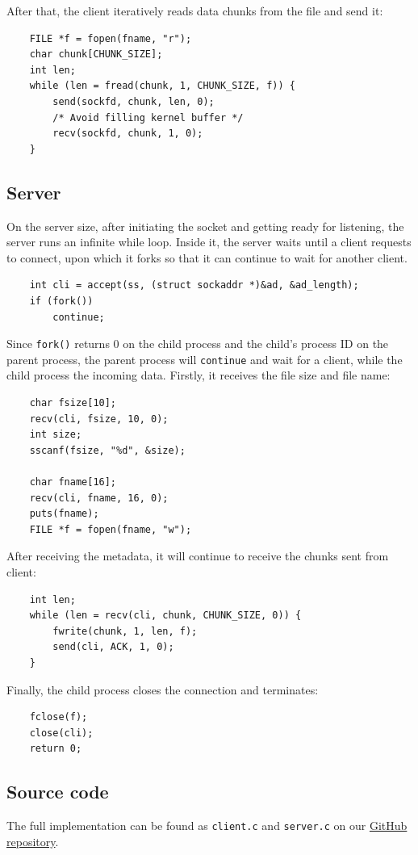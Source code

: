 \documentclass{article}
\begin{document}
After that, the client iteratively reads data chunks from the file and send it:

\begin{verbatim}
	FILE *f = fopen(fname, "r");
	char chunk[CHUNK_SIZE];
	int len;
	while (len = fread(chunk, 1, CHUNK_SIZE, f)) {
		send(sockfd, chunk, len, 0);
		/* Avoid filling kernel buffer */
		recv(sockfd, chunk, 1, 0);
	}
\end{verbatim}

\subsection{Server}

On the server size, after initiating the socket and getting ready for listening,
the server runs an infinite while loop. Inside it, the server waits until a client
requests to connect, upon which it forks so that it can continue
to wait for another client.

\begin{verbatim}
	int cli = accept(ss, (struct sockaddr *)&ad, &ad_length);
	if (fork())
		continue;
\end{verbatim}

Since \texttt{fork()} returns 0 on the child process and the child's process ID
on the parent process, the parent process will \texttt{continue} and wait for a client,
while the child process the incoming data. Firstly, it receives the file size and file name:

\begin{verbatim}
	char fsize[10];
	recv(cli, fsize, 10, 0);
	int size;
	sscanf(fsize, "%d", &size);

	char fname[16];
	recv(cli, fname, 16, 0);
	puts(fname);
	FILE *f = fopen(fname, "w");
\end{verbatim}

After receiving the metadata, it will continue to receive the chunks sent from client:

\begin{verbatim}
	int len;
	while (len = recv(cli, chunk, CHUNK_SIZE, 0)) {
		fwrite(chunk, 1, len, f);
		send(cli, ACK, 1, 0);
	}
\end{verbatim}

Finally, the child process closes the connection and terminates:

\begin{verbatim}
	fclose(f);
	close(cli);
	return 0;
\end{verbatim}

\subsection{Source code}

The full implementation can be found as \texttt{client.c} and \texttt{server.c} on
our \href{https://github.com/Huy-Ngo/ds2021/tree/master/pw1}{GitHub repository}.
\end{document}
